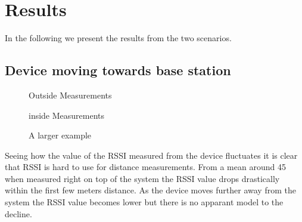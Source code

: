 \section{Results}
\label{sec_results}

In the following we present the results from the two scenarios.

\subsection{Device moving towards base station}


\begin{figure}		



\caption{ Outside Measurements }
\label{graf_OutsideMesurements}

\end{figure}

\begin{figure}		
	
	
	
	\caption{ inside Measurements }
	\label{graf_InsideMesurements}
	
\end{figure}


\begin{figure}
	
	
	\caption{A larger example}
\end{figure}

Seeing how the value of the RSSI measured from the device fluctuates it is clear that RSSI is hard to use for distance measurements. From a mean around 45 when measured right on top of the system the RSSI value drops drastically within the first few meters distance. As the device moves further away from the system the RSSI value becomes lower but there is no apparant model to the decline.
